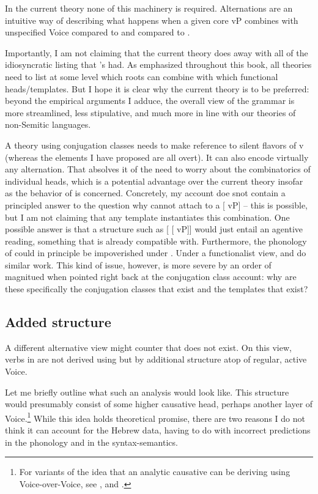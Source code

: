 In the current theory none of this machinery is required. Alternations are an intuitive way of describing what happens when a given core vP combines with unspecified Voice compared to {\vz} and compared to {\vd}.

Importantly, I am not claiming that the current theory does away with all of the idiosyncratic listing that \citeauthor{arad05}'s had. As emphasized throughout this book, all theories need to list at some level which roots can combine with which functional heads/templates. But I hope it is clear why the current theory is to be preferred: beyond the empirical arguments I adduce, the overall view of the grammar is more streamlined, less stipulative, and much more in line with our theories of non-Semitic languages.

A theory using conjugation classes needs to make reference to silent flavors of v (whereas the elements I have proposed are all overt). It can also encode virtually any alternation. That absolves it of the need to worry about the combinatorics of individual heads, which is a potential advantage over the current theory insofar as the behavior of {\vd} is concerned. Concretely, my account doe snot contain a principled answer to the question why {\vd} cannot attach to a [{\va} vP] -- this is possible, but I am not claiming that any template instantiates this combination. One possible answer is that a structure such as [{\vd} [{\va} vP]] would just entail an agentive reading, something that {\vd} is already compatible with. Furthermore, the phonology of {\va} could in principle be impoverished under {\vd}. Under a functionalist view, {\va} and {\vd} do similar work. This kind of issue, however, is more severe by an order of magnitued when pointed right back at the conjugation class account: why are these specifically the conjugation classes that exist and the templates that exist?

	\subsection{Added structure} \label{vd:others:struct}
A different alternative view might counter that {\vd} does not exist. On this view, verbs in {\thif} are not derived using {\vd} but by additional structure atop of regular, active Voice.

Let me briefly outline what such an analysis would look like. This structure would presumably consist of some higher causative head, perhaps another layer of Voice.\footnote{For variants of the idea that an analytic causative can be deriving using Voice-over-Voice, see \cite{tubinoblanco11}, \cite{harley13lingua,harley17oup} and \cite{nie19}.} While this idea holds theoretical promise, there are two reasons I do not think it can account for the Hebrew data, having to do with incorrect predictions in the phonology and in the syntax-semantics.

